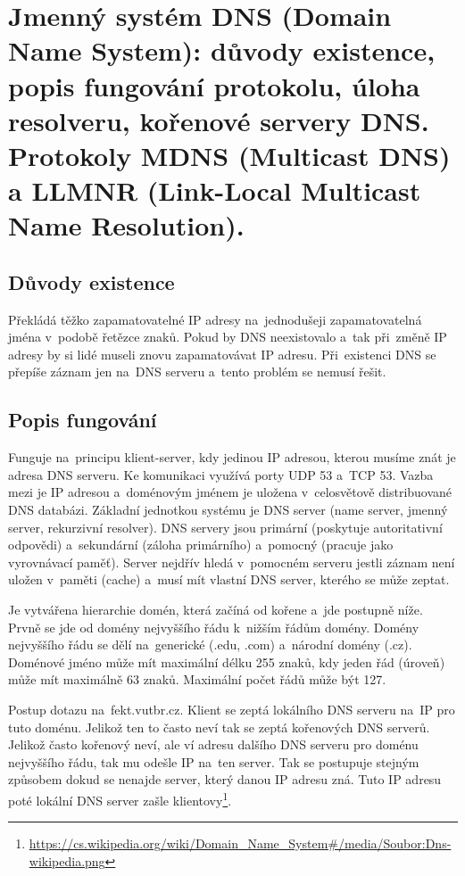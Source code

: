 \clearpage
\section{Jmenný systém DNS (Domain Name System): důvody existence, popis fungování protokolu, úloha resolveru, kořenové servery DNS. Protokoly MDNS (Multicast DNS) a LLMNR (Link-Local Multicast Name Resolution).}

\subsection{Důvody existence}
Překládá těžko zapamatovatelné IP adresy na~jednodušeji zapamatovatelná jména v~podobě řetězce znaků.
Pokud by DNS neexistovalo a~tak při~změně IP adresy by si lidé museli znovu zapamatovávat IP adresu.
Při~existenci DNS se přepíše záznam jen na~DNS serveru a~tento problém se nemusí řešit.

\subsection{Popis fungování}

Funguje na~principu klient-server, kdy jedinou IP adresou, kterou musíme znát je adresa DNS serveru.
Ke komunikaci využívá porty UDP 53 a~TCP 53.
Vazba mezi je IP adresou a~doménovým jménem je uložena v~celosvětově distribuované DNS databázi.
Základní jednotkou systému je DNS server (name server, jmenný server, rekurzivní resolver).
DNS servery jsou primární (poskytuje autoritativní odpovědi) a~sekundární (záloha primárního) a~pomocný (pracuje jako vyrovnávací paměť).
Server nejdřív hledá v~pomocném serveru jestli záznam není uložen v~paměti (cache) a~musí mít vlastní DNS server, kterého se může zeptat.

Je vytvářena hierarchie domén, která začíná od kořene a~jde postupně níže.
Prvně se jde od domény nejvyššího řádu k~nižším řádům domény.
Domény nejvyššího řádu se dělí na~generické (.edu, .com) a~národní domény (.cz).
Doménové jméno může mít maximální délku 255 znaků, kdy jeden řád (úroveň) může mít maximálně 63 znaků. Maximální počet řádů může být 127.

Postup dotazu na~fekt.vutbr.cz.
Klient se zeptá lokálního DNS serveru na~IP pro tuto doménu.
Jelikož ten to často neví tak se zeptá kořenových DNS serverů.
Jelikož často kořenový neví, ale ví adresu dalšího DNS serveru pro doménu nejvyššího řádu, tak mu odešle IP na~ten server.
Tak se postupuje stejným způsobem dokud se nenajde server, který danou IP adresu zná.
Tuto IP adresu poté lokální DNS server zašle klientovy\footnote{\url{https://cs.wikipedia.org/wiki/Domain_Name_System\#/media/Soubor:Dns-wikipedia.png}}.

